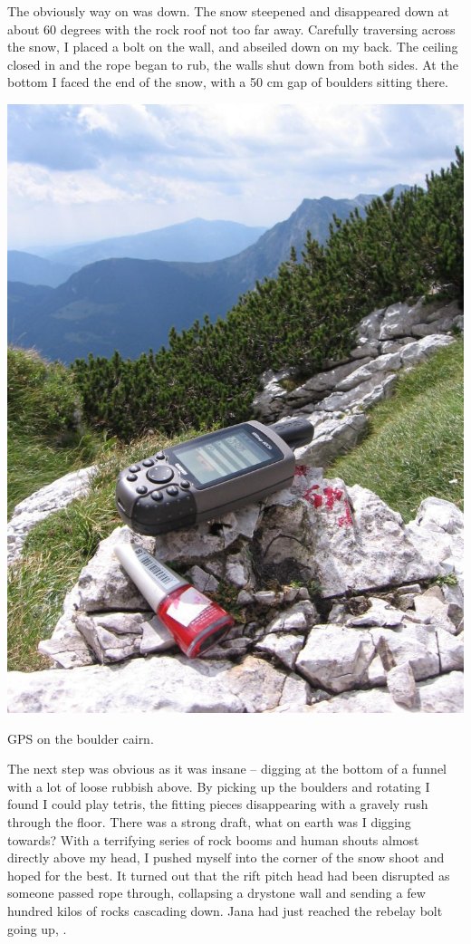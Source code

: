 The obviously way on was down. The snow steepened and
disappeared down at about 60 degrees with the rock roof not too far
away. Carefully traversing across the snow, I placed a bolt on the wall,
and abseiled down on my back. The ceiling closed in and the rope began
to rub, the walls shut down from both sides. At the bottom I faced the
end of the snow, with a 50 cm gap of boulders sitting there.

\begin{marginfigure}
\checkoddpage \ifoddpage \forcerectofloat \else \forceversofloat \fi
\centering
 \includegraphics[width=\linewidth]{2007/b9/jarvist frost - b9 boulder cairn gps--orig.jpg} 
 \caption{GPS on the \protect{} boulder cairn. }
\end{marginfigure}


The next step was obvious as it was insane -- digging at the bottom of a
funnel with a lot of loose rubbish above. By picking up the boulders and
rotating I found I could play tetris, the fitting pieces disappearing
with a gravely rush through the floor. There was a strong draft, what on
earth was I digging towards? With a terrifying series of rock booms and
human shouts almost directly above my head, I pushed myself into the
corner of the snow shoot and hoped for the best. It turned out that the
rift pitch head had been disrupted as someone passed rope through,
collapsing a drystone wall and sending a few hundred kilos of rocks
cascading down. Jana had just reached the rebelay bolt going up,
.

